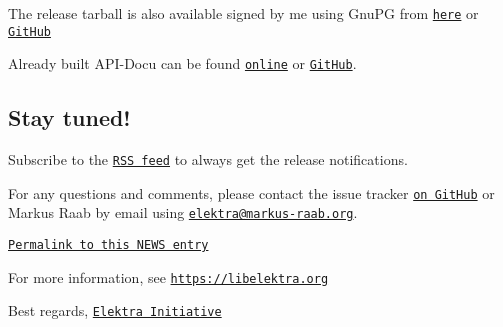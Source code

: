 The release tarball is also available signed by me using Gnu\+PG from \href{https://www.libelektra.org/ftp/elektra/releases/elektra-0.8.24.tar.gz.gpg}{\tt here} or \href{https://github.com/ElektraInitiative/ftp/blob/master/releases//elektra-0.8.24.tar.gz.gpg?raw=true}{\tt Git\+Hub}

Already built A\+P\+I-\/\+Docu can be found \href{https://doc.libelektra.org/api/0.8.24/html/}{\tt online} or \href{https://github.com/ElektraInitiative/doc/tree/master/api/0.8.24}{\tt Git\+Hub}.

\subsection*{Stay tuned!}

Subscribe to the \href{https://www.libelektra.org/news/feed.rss}{\tt R\+SS feed} to always get the release notifications.

For any questions and comments, please contact the issue tracker \href{http://issues.libelektra.org}{\tt on Git\+Hub} or Markus Raab by email using \href{mailto:elektra@markus-raab.org}{\tt elektra@markus-\/raab.\+org}.

\href{https://www.libelektra.org/news/0.8.24-release}{\tt Permalink to this N\+E\+WS entry}

For more information, see \href{https://libelektra.org}{\tt https\+://libelektra.\+org}

Best regards, \href{https://www.libelektra.org/developers/authors}{\tt Elektra Initiative} 